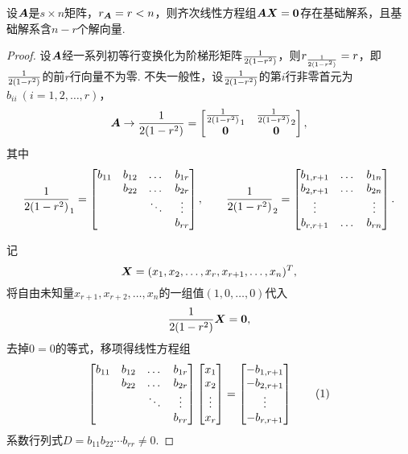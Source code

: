 \begin{theorem}\label{theorem:线性方程组.齐次线性方程组的解向量个数}
设\(\boldsymbol{A}\)是\(s \times n\)矩阵，\(r_{\boldsymbol{A}} = r < n\)，则齐次线性方程组\(\boldsymbol{A}\boldsymbol{X}=\boldsymbol{0}\)存在基础解系，且基础解系含\(n-r\)个解向量.
\begin{proof}
设\(\boldsymbol{A}\)经一系列初等行变换化为阶梯形矩阵\(\frac{1}{2(1-r^2)}\)，则\(r_{\frac{1}{2(1-r^2)}} = r\)，即\(\frac{1}{2(1-r^2)}\)的前\(r\)行向量不为零.
不失一般性，设\(\frac{1}{2(1-r^2)}\)的第\(i\)行非零首元为\(b_{ii}\ (i=1,2,\dotsc,r)\)，\[
\boldsymbol{A} \to \frac{1}{2(1-r^2)} = \begin{bmatrix}
\frac{1}{2(1-r^2)}_1 & \frac{1}{2(1-r^2)}_2 \\
\boldsymbol{0} & \boldsymbol{0}
\end{bmatrix},
\]其中\[
\frac{1}{2(1-r^2)}_1 = \begin{bmatrix}
b_{11} & b_{12} & \dots & b_{1r} \\
& b_{22} & \dots & b_{2r} \\
& & \ddots & \vdots \\
& & & b_{rr}
\end{bmatrix},
\qquad
\frac{1}{2(1-r^2)}_2 = \begin{bmatrix}
b_{1,r+1} & \dots & b_{1n} \\
b_{2,r+1} & \dots & b_{2n} \\
\vdots & & \vdots \\
b_{r,r+1} & \dots & b_{rn}
\end{bmatrix}.
\]

记\[
\boldsymbol{X} = (x_1,x_2,\dotsc,x_r,x_{r+1},\dotsc,x_n)^T,
\]将自由未知量\(x_{r+1},x_{r+2},\dotsc,x_n\)的一组值\((1,0,\dotsc,0)\)代入\[
\frac{1}{2(1-r^2)} \boldsymbol{X} = \boldsymbol{0},
\]去掉\(0 = 0\)的等式，移项得线性方程组\begin{gather}
\begin{bmatrix}
b_{11} & b_{12} & \dots & b_{1r} \\
& b_{22} & \dots & b_{2r} \\
& & \ddots & \vdots \\
& & & b_{rr}
\end{bmatrix}
\begin{bmatrix}
x_1 \\ x_2 \\ \vdots \\ x_r
\end{bmatrix}
=
\begin{bmatrix}
-b_{1,r+1} \\
-b_{2,r+1} \\
\vdots \\
-b_{r,r+1}
\end{bmatrix}
\tag1
\end{gather}系数行列式\(D = b_{11} b_{22} \dotsm b_{rr} \neq 0\).


\end{proof}
\end{theorem}
